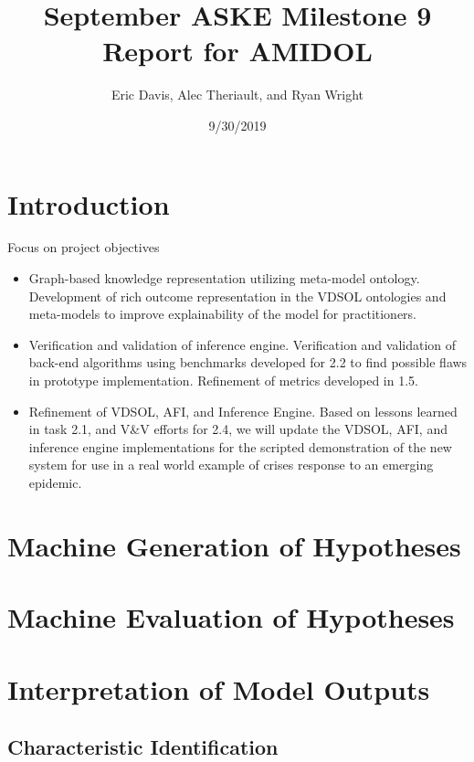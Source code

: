 \documentclass[12pt]{galois-whitepaper}
\author{Eric Davis, Alec Theriault, and Ryan Wright}
\title{September ASKE Milestone 9 Report for AMIDOL}
\date{9/30/2019}
\begin{document}
\maketitle

\vspace*{2cm}
\tableofcontents

\section{Introduction}

Focus on project objectives

\begin{itemize}
  \item Graph-based knowledge representation utilizing meta-model
    ontology. Development of rich outcome representation in the VDSOL
    ontologies and meta-models to improve explainability of the model
    for practitioners.
  \item Verification and validation of inference engine. Verification
    and validation of back-end algorithms using benchmarks developed
    for 2.2 to find possible flaws in prototype
    implementation. Refinement of metrics developed in 1.5.
  \item Refinement of VDSOL, AFI, and Inference Engine. Based on
    lessons learned in task 2.1, and V\&V efforts for 2.4, we will
    update the VDSOL, AFI, and inference engine implementations for
    the scripted demonstration of the new system for use in a real
    world example of crises response to an emerging epidemic.
    
\end{itemize}

\section{Machine Generation of Hypotheses}

\section{Machine Evaluation of Hypotheses}

\section{Interpretation of Model Outputs}

\subsection{Characteristic Identification}
\end{document}
